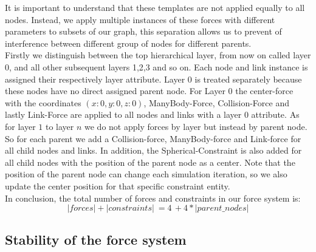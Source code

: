 It is important to understand that these templates are not applied equally to all nodes. Instead, we apply multiple instances of these forces with different parameters to subsets of our graph, this separation allows us to prevent of interference between different group of nodes for different parents.\\ 
Firstly we distinguish between the top hierarchical layer, from now on called layer $0$, and all other subsequent layers 1,2,3 and so on. Each node and link instance is assigned their respectively layer attribute. Layer $0$ is treated separately because these nodes have no direct assigned parent node. 
For Layer $0$ the center-force with the coordinates $(x:0,y:0,z:0)$, ManyBody-Force, Collision-Force and lastly Link-Force are applied to all nodes and links with a layer $0$ attribute. 
As for layer $1$ to layer $n$ we do not apply forces by layer but instead by parent node. So for each parent we add a Collision-force, ManyBody-force and Link-force for all child nodes and links. In addition, the Spherical-Constraint is also added for all child nodes with the position of the parent node as a center. Note that the position of the parent node can change each simulation iteration, so we also update the center position for that specific constraint entity.\\
In conclusion, the total number of forces and constraints in our force system is: 
\begin{equation}
    |forces| + |constraints| \: = 4 \, + 4 * |parent\_nodes|
\end{equation}

\subsection{Stability of the force system}

